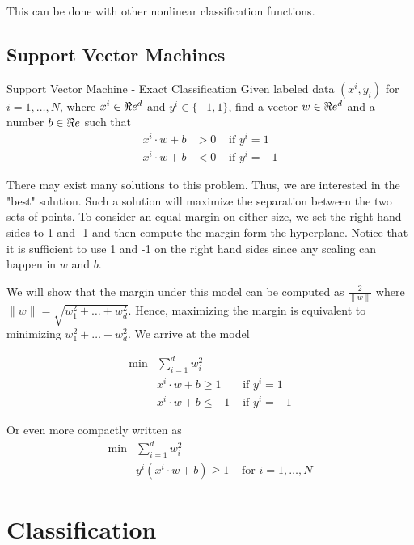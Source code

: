 This can be done with other nonlinear classification functions.  

\subsection{Support Vector Machines}

\begin{general}{Support Vector Machine - Exact Classification}{}
Given labeled data $(x^i, y_i)$ for $i=1, \dots, N$, where $x^i \in \Re e^d$ and $y^i \in \{-1,1\}$, find a vector $w \in \Re e^d$ and a number $b \in \Re e$ such that 
\begin{align}
x^i \cdot w + b & > 0  & \text{ if } y^i = 1\\
x^i \cdot w + b & < 0  & \text{ if } y^i = -1
\end{align}
\end{general}

There may exist many solutions to this problem.  Thus, we are interested in the "best" solution.  Such a solution will maximize the separation between the two sets of points.  To consider an equal margin on either size, we set the right hand sides to 1 and -1 and then compute the margin form the hyperplane.  Notice that it is sufficient to use 1 and -1 on the right hand sides since any scaling can happen in $w$ and $b$.

\begin{center}
\end{center}
We will show that the margin under this model can be computed as $\frac{2}{\|w\|}$ where $\|w\| = \sqrt{w_1^2 +  \dots + w_d^2}$.  Hence,  maximizing the margin is equivalent to minimizing $w_1^2 +  \dots + w_d^2$.  We arrive at the model

\begin{align}
\min & \sum_{i=1}^d w_i^2\\
&x^i \cdot w + b  \geq 1  & \text{ if } y^i = 1\\
&x^i \cdot w + b  \leq -1  & \text{ if } y^i = -1
\end{align}

Or even more compactly written as 
\begin{align}
\min & \sum_{i=1}^d w_i^2\\
&y^i(x^i \cdot w + b) \geq 1  & \text{ for } i=1, \dots, N
\end{align}






\section{Classification}



